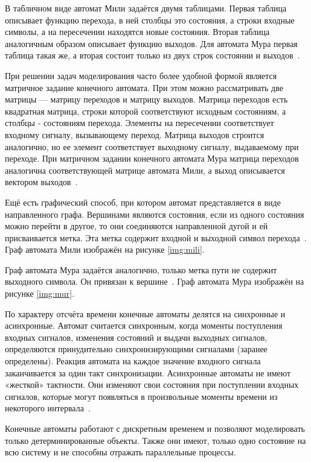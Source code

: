 В табличном виде автомат Мили задаётся двумя таблицами. Первая таблица описывает функцию перехода, в ней столбцы это состояния, а строки входные символы, а на пересечении находятся новые состояния. Вторая таблица аналогичным образом описывает функцию выходов. Для автомата Мура первая таблица такая же, а вторая состоит только из двух строк состоянии и выходов~\cite{ak_types}.

При решении задач моделирования часто более удобной формой является матричное задание конечного автомата. При этом можно рассматривать две матрицы --- матрицу переходов и матрицу выходов. Матрица переходов есть квадратная матрица, строки которой соответствуют исходным состояниям, а столбцы - состояниям перехода. Элементы на пересечении соответствует входному сигналу, вызывающему переход. Матрица выходов строится аналогично, но ее элемент соответствует выходному сигналу, выдаваемому при переходе. При матричном задании конечного автомата Мура матрица переходов аналогична соответствующей матрице автомата Мили, а выход описывается вектором выходов~\cite{ak_types}.

Ещё есть графический способ, при котором автомат представляется в виде направленного графа. Вершинами являются состояния, если из одного состояния можно перейти в другое, то они соединяются направленной дугой и ей присваивается метка. Эта метка содержит входной и выходной символ перехода~\cite{ak_types}. Граф автомата Мили изображён на рисунке \ref{img:mili}.

\FloatBarrier

Граф автомата Мура задаётся аналогично, только метка пути не содержит выходного символа. Он привязан к вершине~\cite{ak_types}. Граф автомата Мура изображён на рисунке \ref{img:mur}.

\FloatBarrier

По характеру отсчёта времени конечные автоматы делятся на синхронные и асинхронные. Автомат считается синхронным, когда моменты поступления входных сигналов, изменения состояний и выдачи выходных сигналов, определяются принудительно синхронизирующими сигналами (заранее определены). Реакция автомата на каждое значение входного сигнала заканчивается за один такт синхронизации. Асинхронные автоматы не имеют «жесткой» тактности. Они изменяют свои состояния при поступлении входных сигналов, которые могут появляться в произвольные моменты времени из некоторого интервала~\cite{ak_det}.

Конечные автоматы работают с дискретным временем и позволяют моделировать только детерминированные объекты. Также они имеют, только одно состояние на всю систему и не способны отражать параллельные процессы. 

